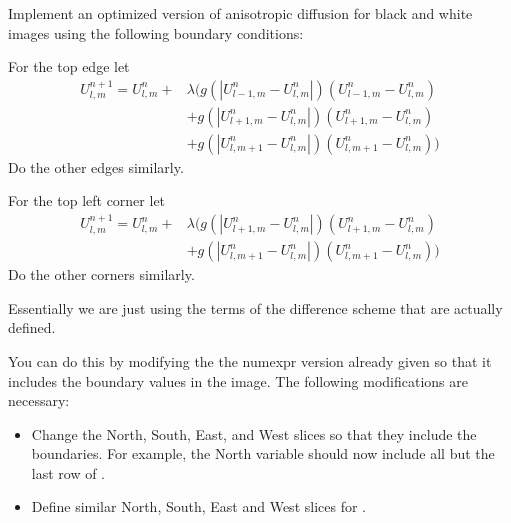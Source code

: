 \begin{problem}
\label{prob:anisdiff_bw}
Implement an optimized version of anisotropic diffusion for black and white images using the following boundary conditions:

For the top edge let
\begin{align*}
U_{l,m}^{n+1} = U_{l,m}^n + & \lambda (g(|U_{l-1,m}^n - U_{l,m}^n|)(U_{l-1,m}^n - U_{l,m}^n) \\
					& + g(|U_{l+1,m}^n - U_{l,m}^n|)(U_{l+1,m}^n - U_{l,m}^n) \\
					& + g(|U_{l,m+1}^n - U_{l,m}^n|)(U_{l,m+1}^n - U_{l,m}^n))
\end{align*}
Do the other edges similarly.

For the top left corner let
\begin{align*}
U_{l,m}^{n+1} = U_{l,m}^n + & \lambda (g(|U_{l+1,m}^n - U_{l,m}^n|)(U_{l+1,m}^n - U_{l,m}^n) \\
					& + g(|U_{l,m+1}^n - U_{l,m}^n|)(U_{l,m+1}^n - U_{l,m}^n))
\end{align*}
Do the other corners similarly.

Essentially we are just using the terms of the difference scheme that are actually defined.

You can do this by modifying the the numexpr version already given so that it includes the boundary values in the image.
The following modifications are necessary:
\begin{itemize}

\item Change the North, South, East, and West slices so that they include the boundaries.
For example, the North variable should now include all but the last row of .

\item Define similar North, South, East and West slices for .


\end{itemize}
\end{problem}
